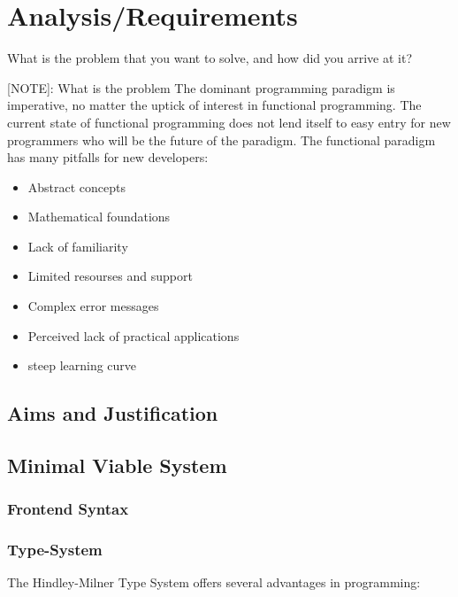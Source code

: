 \documentclass{l4proj}
\begin{document}
\chapter{Analysis/Requirements}
What is the problem that you want to solve, and how did you arrive at it?

[NOTE]: What is the problem
The dominant programming paradigm is imperative, no matter the uptick of interest in functional programming.
The current state of functional programming does not lend itself to easy entry for new programmers who will be the future of the paradigm.
The functional paradigm has many pitfalls for new developers:
\begin{itemize}
    \item Abstract concepts
    \item Mathematical foundations
    \item Lack of familiarity
    \item Limited resourses and support
    \item Complex error messages
    \item Perceived lack of practical applications
    \item steep learning curve
\end{itemize}

\section{Aims and Justification}
\section{Minimal Viable System}
\subsection{Frontend Syntax}
\subsection{Type-System}
The Hindley-Milner Type System offers several advantages in programming:
\end{document}
